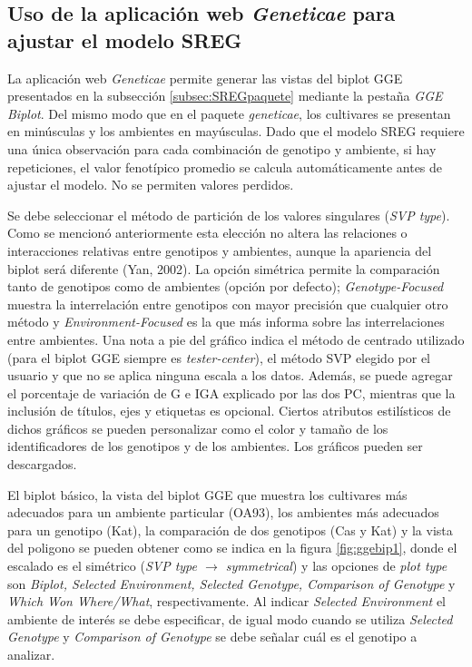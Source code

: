 \subsection{Uso de la aplicación web \emph{Geneticae} para ajustar el modelo SREG}

La aplicación web \emph{Geneticae} permite generar las vistas del biplot GGE presentados en la subsección \ref{subsec:SREGpaquete} mediante la pestaña \emph{GGE Biplot}. Del mismo modo que en el paquete \emph{geneticae}, los cultivares se presentan en minúsculas y los ambientes en mayúsculas. Dado que el modelo SREG requiere una única observación para cada combinación de genotipo y ambiente, si hay repeticiones, el valor fenotípico promedio se calcula automáticamente antes de ajustar el modelo. No se permiten valores perdidos. 

Se debe seleccionar el método de partición de los valores singulares (\emph{SVP type}). Como se mencionó anteriormente esta elección no altera las relaciones o interacciones relativas entre genotipos y ambientes, aunque la apariencia del biplot será diferente (Yan, 2002). La opción simétrica permite la comparación tanto de genotipos como de ambientes (opción por defecto); \emph{Genotype-Focused} muestra la interrelación entre genotipos con mayor precisión que cualquier otro método y \emph{Environment-Focused} es la que más informa sobre las interrelaciones entre ambientes. Una nota a pie del gráfico indica el método de centrado utilizado (para el biplot GGE siempre es \emph{tester-center}), el método SVP elegido por el usuario y que no se aplica ninguna escala a los datos. Además, se puede agregar el porcentaje de variación de G e IGA explicado por las dos PC, mientras que la inclusión de títulos, ejes y etiquetas es opcional. Ciertos atributos estilísticos de dichos gráficos se pueden personalizar como el color y tamaño de los identificadores de los genotipos y de los ambientes. Los gráficos pueden ser descargados.  

El biplot básico, la vista del biplot GGE que muestra los cultivares más adecuados para un ambiente particular (OA93), los ambientes más adecuados para un genotipo (Kat), la comparación de dos genotipos (Cas y Kat) y la vista del poligono se pueden obtener como se indica en la figura \ref{fig:ggebip1}, donde el escalado es el simétrico (\emph{SVP type $\rightarrow$ symmetrical}) y las opciones de \emph{plot type} son \emph{Biplot,
Selected Environment, Selected Genotype, Comparison of Genotype} y \emph{Which Won Where/What}, respectivamente. Al indicar \emph{Selected Environment} el ambiente de interés se debe especificar, de igual modo cuando se utiliza \emph{Selected Genotype} y 
\emph{Comparison of Genotype} se debe señalar cuál es el genotipo a analizar.

